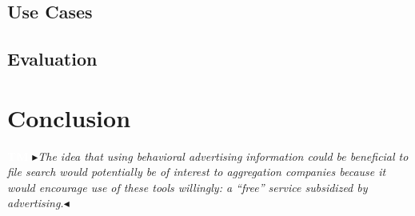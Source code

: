 \documentclass[sigconf,anonymous,review]{acmart}
\newcommand{\nbc}[3]{
 {\colorbox{#3}{\bfseries\sffamily\scriptsize\textcolor{white}{#1}}}
 {\textcolor{#3}{\sf\small$\blacktriangleright$\textit{#2}$\blacktriangleleft$}}}
\newcommand\tm[1]{\nbc{TM}{#1}{tmcolor}}
\begin{document}
\subsection{Use Cases}

\subsection{Evaluation}

\section{Conclusion}

\tm{The idea that using behavioral advertising information could be beneficial
to file search would potentially be of interest to aggregation companies
because it would encourage use of these tools willingly: a ``free'' service
subsidized by advertising.}


\nocite{*}
\clearpage



\end{document}
